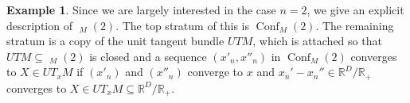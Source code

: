 \documentclass{scrartcl}
\theoremstyle{plain}
\theoremstyle{definition}
\newtheorem{example}[theorem]{Example}
\newcommand{\R}{\mathbb R}
\renewcommand{\subset}{\subseteq}
\DeclareMathOperator{\Conf}{Conf}
\DeclareMathOperator{\cConf}{\overline{Conf}}
\begin{document}
\begin{example}
    Since we are largely interested in the case $n=2$, we give an explicit description of $\cConf_M(2)$. The top stratum of this is $\Conf_M(2)$. The remaining stratum is a copy of the unit tangent bundle $UTM$, which is attached so that $UTM\subset \cConf_M(2)$ is closed and a sequence $(x'_n, x''_n)$ in $\Conf_M(2)$ converges to $X\in UT_xM$ if $(x'_n)$ and $(x''_n)$ converge to $x$ and $x_n'-x_n''\in \R^D/ \R_+$ converges to $X\in UT_xM\subset\R^D/\R_+$. 
\end{example}



\end{document}
